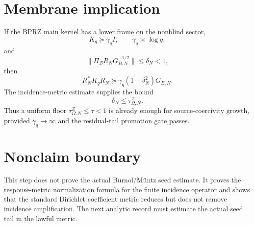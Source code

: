 \documentclass[11pt]{article}
\begin{document}
\section{Membrane implication}
If the BPRZ main kernel has a lower frame on the nonblind sector,
\[
K_q\succeq \gamma_q I,
\qquad \gamma_q\asymp\log q,
\]
and
\[
\|\Pi_{\mathcal B}R_NG_{B,N}^{-1/2}\|
\le \delta_N<1,
\]
then
\[
R_N^*K_qR_N\succeq \gamma_q(1-\delta_N^2)G_{B,N}.
\]
The incidence-metric estimate supplies the bound
\[
\delta_N\le \tau_{\Omega,N}^{Z}.
\]
Thus a uniform floor $\tau_{\Omega,N}^{Z}\le\tau<1$ is already enough for source-coercivity growth, provided $\gamma_q\to\infty$ and the residual-tail promotion gate passes.

\section{Nonclaim boundary}
This step does not prove the actual Burnol/Müntz seed estimate.  It proves the response-metric normalization formula for the finite incidence operator and shows that the standard Dirichlet coefficient metric reduces but does not remove incidence amplification.  The next analytic record must estimate the actual seed tail in the lawful metric.
\end{document}
